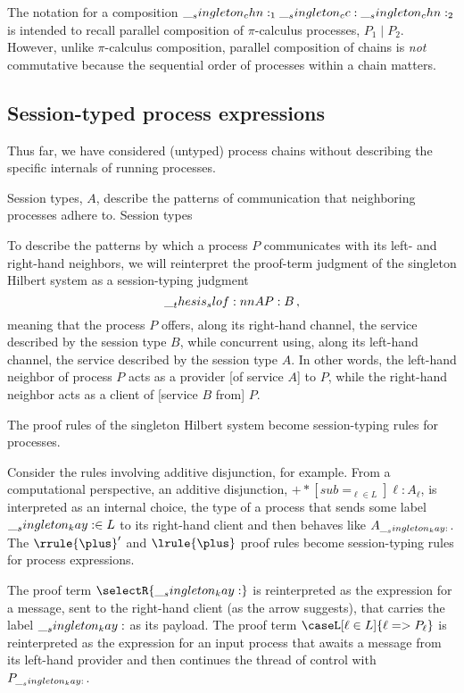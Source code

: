 The notation for a composition $\__singleton_chn:_1 \__singleton_cc: \__singleton_chn:_2$ is intended to recall parallel composition of $\pi$-calculus processes, $P_1 \mid P_2$.
However, unlike $\pi$-calculus composition, parallel composition of chains is \emph{not} commutative because the sequential order of processes within a chain matters.


\subsection{Session-typed process expressions}

Thus far, we have considered (untyped) process chains without describing the specific internals of running processes.

Session types, $A$, describe the patterns of communication that neighboring processes adhere to.
Session types 

To describe the patterns by which a process $P$ communicates with its left- and right-hand neighbors, %
we will reinterpret the proof-term judgment of the singleton Hilbert system as a session-typing judgment
\begin{equation*}
  \slof{A |- P : B} \,,
\end{equation*}
meaning that the process $P$ offers, along its right-hand channel, the service described by the session type $B$, while concurrent using, along its left-hand channel, the service described by the session type $A$.
In other words, the left-hand neighbor of process $P$ acts as a provider [of service $A$] to $P$, while the right-hand neighbor acts as a client of [service $B$ from] $P$.

The proof rules of the singleton Hilbert system become session-typing rules for processes.


Consider the rules involving additive disjunction, for example.
From a computational perspective, an additive disjunction, $\plus*[sub=_{\ell \in L}]{\ell:A_{\ell}}$, is interpreted as an internal choice, the type of a process that sends some label $\__singleton_kay: \in L$ to its right-hand client and then behaves like $A_{\__singleton_kay:}$.
The $\rrule{\plus}'$ and $\lrule{\plus}$ proof rules become session-typing rules for process expressions.
The proof term $\selectR{\kay}$ is reinterpreted as the expression for a message, sent to the right-hand client (as the arrow suggests), that carries the label $\__singleton_kay:$ as its payload.
The proof term $\caseL[\ell \in L]{\ell => P_{\ell}}$ is reinterpreted as the expression for an input process that awaits a message from its left-hand provider and then continues the thread of control with $P_{\__singleton_kay:}$.



